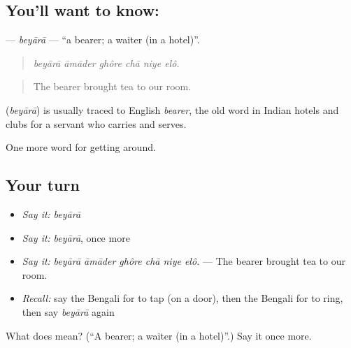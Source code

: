 \subsection*{You'll want to know: }
\textbf{} — \emph{beyārā} — \textquotedblleft{}a bearer; a waiter (in a hotel)\textquotedblright{}.

\begin{quote}
     
\end{quote}

\begin{quote}
\emph{beyārā āmāder ghôre chā niye elô.}
\end{quote}

\begin{quote}
The bearer brought tea to our room.
\end{quote}

\begin{cousinweb}
\textbf{} (\emph{beyārā}) is usually traced to English \emph{bearer}, the old word in Indian hotels and clubs for a servant who carries and serves.
\end{cousinweb}

\begin{grammarlens}[title={What you've built}]
One more word for getting around.
\end{grammarlens}

\subsection*{Your turn}
\begin{itemize}
\raggedright
  \item \emph{Say it:} \emph{beyārā}
  \item \emph{Say it:} \emph{beyārā}, once more
  \item \emph{Say it:} \emph{beyārā āmāder ghôre chā niye elô.} — The bearer brought tea to our room.
  \item \emph{Recall:} say the Bengali for to tap (on a door), then the Bengali for to ring, then say \emph{beyārā} again
\end{itemize}

\begin{tcolorbox}[breakable,colback=teal!4,colframe=teal!35!black,title={Before you move on}]
What does  mean? (\textquotedblleft{}A bearer; a waiter (in a hotel)\textquotedblright{}.) Say it once more.
\end{tcolorbox}
